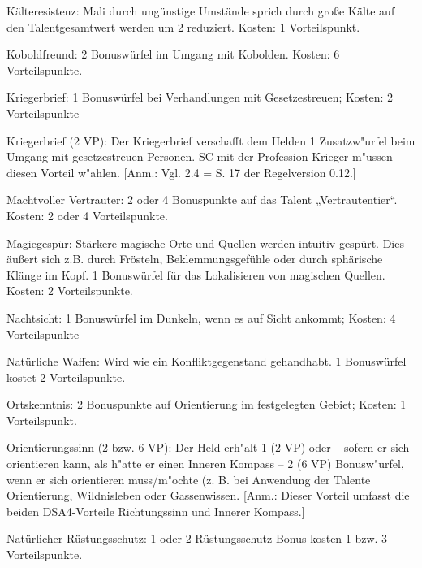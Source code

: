 \begin{description}
\item{Kälteresistenz:} Mali durch ungünstige Umstände sprich durch große Kälte auf den Talentgesamtwert werden um 2 reduziert. Kosten: 1 Vorteilspunkt.

\item{Koboldfreund:} 2 Bonuswürfel im Umgang mit Kobolden. Kosten: 6 Vorteilspunkte.

\item{Kriegerbrief:} 1 Bonuswürfel bei Verhandlungen mit Gesetzestreuen; Kosten: 2 Vorteilspunkte

\item{Kriegerbrief (2 VP):}
Der Kriegerbrief verschafft dem Helden 1 Zusatzw"urfel beim Umgang mit gesetzestreuen Personen. SC mit der Profession Krieger m"ussen diesen Vorteil w"ahlen. [Anm.: Vgl. 2.4 = S. 17 der Regelversion 0.12.]

\item{Machtvoller Vertrauter:} 2 oder 4 Bonuspunkte auf das Talent „Vertrautentier“. Kosten: 2 oder 4 Vorteilspunkte.

\item{Magiegespür:} Stärkere magische Orte und Quellen werden intuitiv gespürt. Dies äußert sich z.B. durch Frösteln, Beklemmungsgefühle oder durch sphärische Klänge im Kopf. 1 Bonuswürfel für das Lokalisieren von magischen Quellen. Kosten: 2 Vorteilspunkte.

\item{Nachtsicht:} 1 Bonuswürfel im Dunkeln, wenn es auf Sicht ankommt; Kosten: 4 Vorteilspunkte

\item{Natürliche Waffen:} Wird wie ein Konfliktgegenstand gehandhabt. 1 Bonuswürfel kostet 2 Vorteilspunkte.

\item{Ortskenntnis:} 2 Bonuspunkte auf Orientierung im festgelegten Gebiet; Kosten: 1 Vorteilspunkt.

\item{Orientierungssinn (2 bzw. 6 VP):}
Der Held erh"alt 1 (2 VP) oder – sofern er sich orientieren kann, als h"atte er einen Inneren Kompass – 2 (6 VP) Bonusw"urfel, wenn er sich orientieren muss/m"ochte (z. B. bei Anwendung der Talente Orientierung, Wildnisleben oder Gassenwissen. [Anm.: Dieser Vorteil umfasst die beiden DSA4-Vorteile Richtungssinn und Innerer Kompass.]

\item{Natürlicher Rüstungsschutz:} 1 oder 2 Rüstungsschutz Bonus kosten 1 bzw. 3 Vorteilspunkte.


\end{description}
